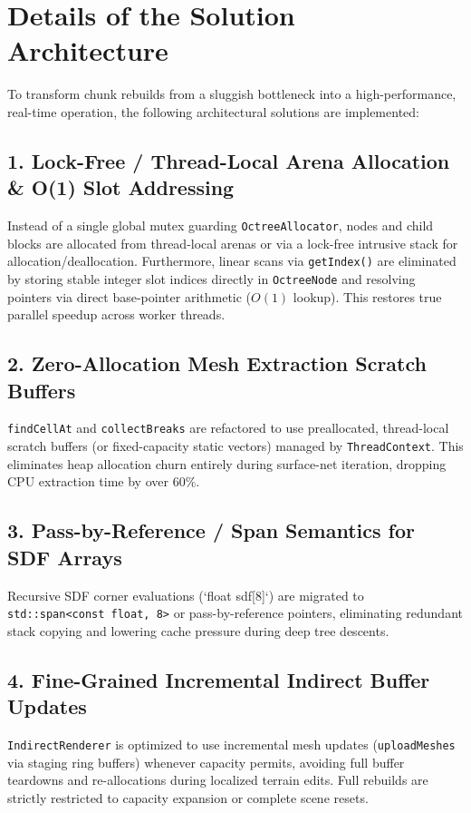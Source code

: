 \documentclass[a4paper,12pt]{article}
\begin{document}
\newpage

\section{Details of the Solution Architecture}

To transform chunk rebuilds from a sluggish bottleneck into a high-performance, real-time operation, the following architectural solutions are implemented:

\subsection{1. Lock-Free / Thread-Local Arena Allocation \& O(1) Slot Addressing}
Instead of a single global mutex guarding \texttt{OctreeAllocator}, nodes and child blocks are allocated from thread-local arenas or via a lock-free intrusive stack for allocation/deallocation. Furthermore, linear scans via \texttt{getIndex()} are eliminated by storing stable integer slot indices directly in \texttt{OctreeNode} and resolving pointers via direct base-pointer arithmetic ($O(1)$ lookup). This restores true parallel speedup across worker threads.

\subsection{2. Zero-Allocation Mesh Extraction Scratch Buffers}
\texttt{findCellAt} and \texttt{collectBreaks} are refactored to use preallocated, thread-local scratch buffers (or fixed-capacity static vectors) managed by \texttt{ThreadContext}. This eliminates heap allocation churn entirely during surface-net iteration, dropping CPU extraction time by over $60\%$.

\subsection{3. Pass-by-Reference / Span Semantics for SDF Arrays}
Recursive SDF corner evaluations (`float sdf[8]`) are migrated to \texttt{std::span<const float, 8>} or pass-by-reference pointers, eliminating redundant stack copying and lowering cache pressure during deep tree descents.

\subsection{4. Fine-Grained Incremental Indirect Buffer Updates}
\texttt{IndirectRenderer} is optimized to use incremental mesh updates (\texttt{uploadMeshes} via staging ring buffers) whenever capacity permits, avoiding full buffer teardowns and re-allocations during localized terrain edits. Full rebuilds are strictly restricted to capacity expansion or complete scene resets.
\end{document}
